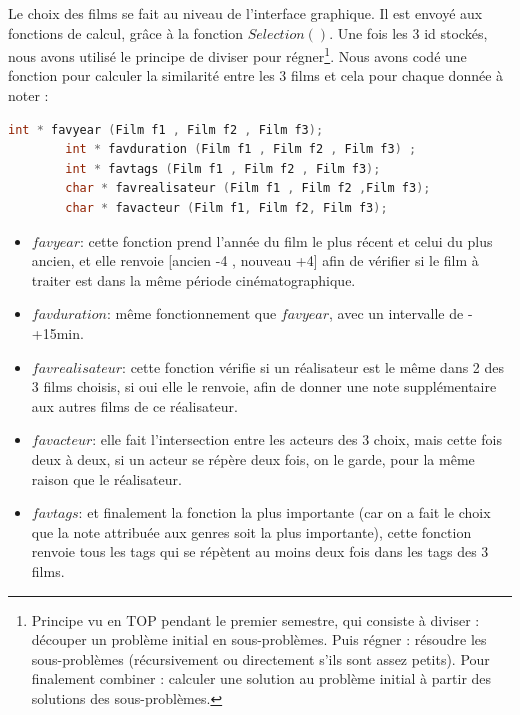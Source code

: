 \documentclass[light]{ceri}
\begin{document}
    Le choix des films se fait au niveau de l'interface graphique. Il est envoyé aux fonctions de calcul, grâce à la fonction $Selection()$. Une fois les 3 id stockés, nous avons utilisé le principe de diviser pour régner\footnote[1]{Principe vu en TOP pendant le premier semestre, qui consiste à diviser : découper un problème initial en sous-problèmes. Puis régner : résoudre les sous-problèmes (récursivement ou directement s'ils sont assez petits). Pour finalement combiner : calculer une solution au problème initial à partir des solutions des sous-problèmes.}. Nous avons codé une fonction pour calculer la similarité entre les 3 films et cela pour chaque donnée à noter : 
     \begin{lstlisting}[language=c]
        int * favyear (Film f1 , Film f2 , Film f3);
        int * favduration (Film f1 , Film f2 , Film f3) ;
        int * favtags (Film f1 , Film f2 , Film f3);
        char * favrealisateur (Film f1 , Film f2 ,Film f3);
        char * favacteur (Film f1, Film f2, Film f3);
    \end{lstlisting}
    \begin{itemize}
        \item $favyear$: cette fonction prend l'année du film le plus récent et celui du plus ancien, et elle renvoie [ancien -4 , nouveau +4] afin de vérifier si le film à traiter est dans la même période cinématographique.
        \item $favduration$: même fonctionnement que $favyear$, avec un intervalle de -+15min.
        \item $favrealisateur$: cette fonction vérifie si un réalisateur est le même dans 2 des 3 films choisis, si oui elle le renvoie, afin de donner une note supplémentaire aux autres films de ce réalisateur.
        \item $favacteur$: elle fait l'intersection entre les acteurs des 3 choix, mais cette fois deux à deux, si un acteur se répère deux fois, on le garde, pour la même raison que le réalisateur.
        \item $favtags$: et finalement la fonction la plus importante (car on a fait le choix que la note attribuée aux genres soit la plus importante), cette fonction renvoie tous les tags qui se répètent au moins deux fois dans les tags des 3 films.
    \end{itemize}
    
\end{document}
